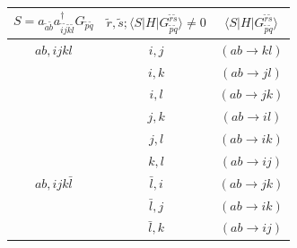 \documentclass[./thesis.tex]{subfiles}
\begin{document}
\begin{table}
\begin{tabular}{ c|c|c }
		\hline \hline
		$S = a_{\tilde a \tilde b} a^\dagger_{\tilde i \tilde j \tilde k \tilde l} G_{\tilde p \tilde q} $ & $\tilde r, \tilde s ;  \langle S|H|G_{\tilde p \tilde q}^{\tilde r \tilde s} \rangle \neq 0$ & $\langle S|H|G_{\tilde p \tilde q}^{\tilde r \tilde s} \rangle$ \\
		\hline \hline
		\rule{0pt}{3ex} $ab,ijkl$                                                                                          & $i,j$                                                                                        & $(ab \rightarrow kl)$                                           \\
		                                                                                                   & $i,k$                                                                                        & $(ab \rightarrow jl)$                                           \\
		                                                                                                   & $i,l$                                                                                        & $(ab \rightarrow jk)$                                           \\
		                                                                                                   & $j,k$                                                                                        & $(ab \rightarrow il)$                                           \\
		                                                                                                   & $j,l$                                                                                        & $(ab \rightarrow ik)$                                           \\
		                                                                                                   & $k,l$                                                                                        & $(ab \rightarrow ij)$                                           \\
		              
		\hline
		\rule{0pt}{3ex} $ab,ijk\bar l$                                                                                     & $\bar l, i$                                                                                  & $(ab \rightarrow jk)$                                           \\
		                                                                                                   & $\bar l, j$                                                                                  & $(ab \rightarrow ik)$                                           \\ 
		                                                                                                   & $\bar l, k$                                                                                  & $(ab \rightarrow ij)$                                           \\ 
		        

\end{tabular}
\end{table}
\end{document}

